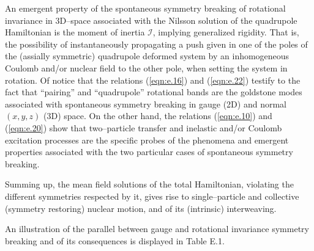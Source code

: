 \documentclass[a4paper,onecolumn,superscriptaddress,12pt,nofootinbib,twoside,raggedfooter,notitlepage]{revtex4-1}
\begin{document}
An emergent property of the spontaneous symmetry breaking of rotational invariance in 3D--space associated with the Nilsson solution of the quadrupole Hamiltonian is the moment of inertia $\mathcal{I}$, implying generalized rigidity. That is, the possibility of instantaneously propagating a push given in one of the poles of the (assially symmetric) quadrupole deformed system by an inhomogeneous Coulomb and/or nuclear field to the other pole, when setting the system in rotation. Of notice that the relations (\ref{eqn:e.16}) and (\ref{eqn:e.22}) testify to the fact that ``pairing'' and ``quadrupole'' rotational bands are the goldstone modes associated with spontaneous symmetry breaking in gauge (2D) and normal $(x,y,z)$ (3D) space. On the other hand, the relations (\ref{eqn:e.10}) and (\ref{eqn:e.20}) show that two--particle transfer and inelastic and/or Coulomb excitation processes are the specific probes of the phenomena and emergent properties associated with the two particular cases of spontaneous symmetry breaking.

Summing up, the mean field solutions of the total Hamiltonian, violating the different symmetries respected by it, gives rise to single--particle and collective (symmetry restoring) nuclear motion, and of its (intrinsic) interweaving.

An illustration of the parallel between gauge and rotational invariance symmetry breaking and of its consequences is displayed in Table E.1.
\end{document}
